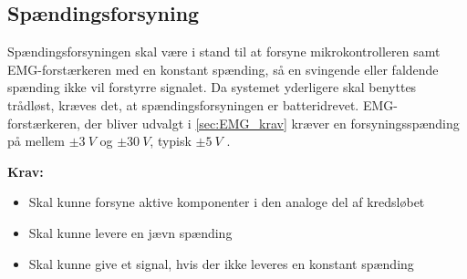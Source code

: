 \subsection{Spændingsforsyning} \label{sec:krav_spaending}
Spændingsforsyningen skal være i stand til at forsyne mikrokontrolleren samt EMG-forstærkeren med en konstant spænding, så en svingende eller faldende spænding ikke vil forstyrre signalet. Da systemet yderligere skal benyttes trådløst, kræves det, at spændingsforsyningen er batteridrevet. EMG-forstærkeren, der bliver udvalgt i \autoref{sec:EMG_krav} kræver en forsyningsspænding på mellem $\pm 3~V$ og $\pm 30~V$, typisk $\pm 5~V$ \citep{advancertech2013}.


\vspace{3mm}
\textbf{Krav:}
\begin{itemize} 
\item Skal kunne forsyne aktive komponenter i den analoge del af kredsløbet
\item Skal kunne levere en jævn spænding
\item Skal kunne give et signal, hvis der ikke leveres en konstant spænding
\end{itemize}
